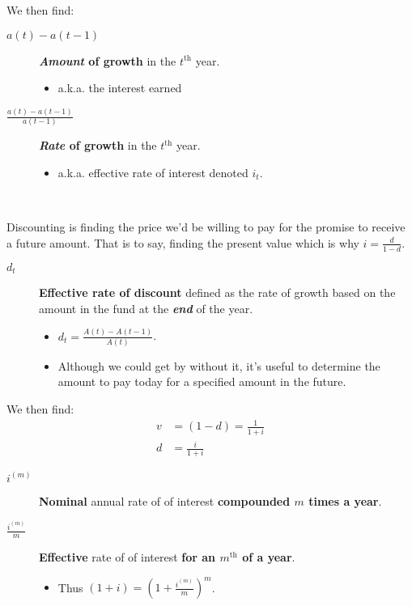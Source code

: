 \documentclass[10pt, french]{article}
\begin{document}
\begin{multicols*}{2}
We then find: 
\begin{description}
	\item[$a(t) - a(t - 1)$]	\textbf{\textit{Amount} of growth} in the $t^{\text{th}}$ year.
		\begin{itemize}[leftmargin = *]
		\item	a.k.a. the interest earned
		\end{itemize}
	\item[$\frac{a(t) - a(t - 1)}{a(t - 1)}$]	\textbf{\textit{Rate} of growth} in the $t^{\text{th}}$ year.
		\begin{itemize}[leftmargin = *]
		\item	a.k.a. effective rate of interest denoted $i_{t}$.
		\end{itemize}
\end{description}

\

Discounting is finding the price we'd be willing to pay for the promise to receive a future amount. That is to say, finding the present value which is why $i = \frac{d}{1 - d}$.
\begin{distributions}
\begin{description}
	\item[$d_{t}$]	\textbf{Effective rate of discount} defined as the rate of growth based on the amount in the fund at the \textbf{\textit{end}} of the year.
		\begin{itemize}
		\item	$d_{t} = \frac{A(t) - A(t - 1)}{A(t)}$.\
		\item	Although we could get by without it, it's useful to determine the amount to pay today for a specified amount in the future.
		\end{itemize}
\end{description}
\end{distributions}

We then find:
\begin{align*}
	v 
	&=	(1 - d) 
	=	\frac{1}{1 + i}	\\
	d 
	&=	\frac{i}{1 + i}
\end{align*}

\begin{distributions}
\begin{description}
	\item[$i^{(m)}$]	\textbf{Nominal} annual rate of of interest \textbf{compounded $m$ times a year}.
	\item[$\frac{i^{(m)}}{m}$]	\textbf{Effective} rate of of interest \textbf{for an $m^{\text{th}}$ of a year}.
		\begin{itemize}[leftmargin = *]
		\item	Thus $(1 + i) = \left(1 + \frac{i^{(m)}}{m}\right)^{m}$.\
		\end{itemize}
\end{description}
\end{distributions}


\end{multicols*}
\end{document}

